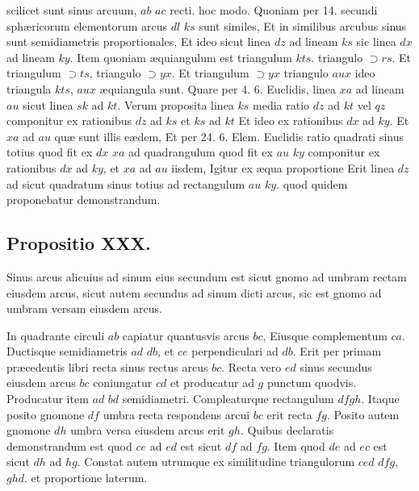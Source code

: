 \documentclass[11pt,a4paper]{article}
\begin{document}
scilicet sunt sinus arcuum, $ab$ $ac$ recti. hoc modo. Quoniam
per 14. secundi sphæricorum elementorum arcus $dl$ $ks$ sunt
similes, Et in similibus arcubus sinus sunt semidiametris
proportionales, Et ideo sicut linea $dz$ ad lineam $ks$ sic linea
$dx$ ad lineam $ky$. Item quoniam æquiangulum est triangulum
$kts$. triangulo $\supset rs$. Et triangulum $\supset ts$, triangulo $\supset yx$. Et
triangulum $\supset yx$ triangulo $aux$ ideo triangula $kts$, $aux$
æquiangula sunt. Quare per 4. 6. Euclidis, linea $xa$ ad lineam
$au$ sicut linea $sk$ ad $kt$. Verum proposita linea $ks$ media ratio
$dz$ ad $kt$ vel $qz$ componitur ex rationibus $dz$ ad $ks$
et $ks$ ad $kt$ Et ideo ex rationibus $dx$ ad $ky$. Et $xa$ ad $au$
quæ sunt illis eædem, Et per 24. 6. Elem. Euclidis ratio quadrati
sinus totius quod fit ex $dx$ $xa$ ad quadrangulum quod fit
ex $au$ $ky$ componitur ex rationibus $dx$ ad $ky$, et $xa$ ad $au$
iisdem, Igitur ex æqua proportione Erit linea $dz$ ad 
sicut quadratum sinus totius ad rectangulum $au$ $ky$. quod quidem
proponebatur demonstrandum.

\subsection*{Propositio XXX.}

Sinus arcus alicuius ad sinum eius secundum est sicut
gnomo ad umbram rectam eiusdem arcus, sicut autem
secundus ad sinum dicti arcus, sic est gnomo ad
umbram versam eiusdem arcus.

In quadrante circuli $ab$ capiatur quantusvis arcus $bc$, Eiusque
complementum $ca$. Ductisque semidiametris $ad$ $db$, et $ce$ perpendiculari
ad $db$. Erit per primam præcedentis libri recta 
sinus rectus arcus $bc$. Recta vero $ed$ sinus secundus eiusdem arcus
$bc$ coniungatur $cd$ et producatur ad $g$ punctum quodvis. Producatur
item $ad$ $bd$ semidiametri. Compleaturque rectangulum
$dfgh$. Itaque posito gnomone $df$ umbra recta respondens arcui
$bc$ erit recta $fg$. Posito autem gnomone $dh$ umbra versa
eiusdem arcus erit $gh$. Quibus declaratis demonstrandum est quod
$ce$ ad $ed$ est sicut $df$ ad $fg$. Item quod $de$ ad $ec$ est sicut
$dh$ ad $hg$. Constat autem utrumque ex similitudine
triangulorum $ced$ $dfg$, $ghd$. et proportione laterum.
\end{document}
